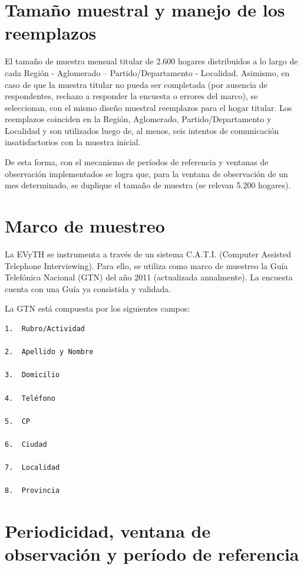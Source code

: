 \documentclass[
  openany]{book}
\begin{document}
\hypertarget{tamauxf1o-muestral-y-manejo-de-los-reemplazos}{%
\section{Tamaño muestral y manejo de los reemplazos}\label{tamauxf1o-muestral-y-manejo-de-los-reemplazos}}

El tamaño de muestra mensual titular de 2.600 hogares distribuidos a lo largo de cada Región - Aglomerado -- Partido/Departamento - Localidad. Asimismo, en caso de que la muestra titular no pueda ser completada (por ausencia de respondentes, rechazo a responder la encuesta o errores del marco), se seleccionan, con el mismo diseño muestral reemplazos para el hogar titular. Los reemplazos coinciden en la Región, Aglomerado, Partido/Departamento y Localidad y son utilizados luego de, al menos, seis intentos de comunicación insatisfactorios con la muestra inicial.

De esta forma, con el mecanismo de períodos de referencia y ventanas de observación implementados se logra que, para la ventana de observación de un mes determinado, se duplique el tamaño de muestra (se relevan 5.200 hogares).

\hypertarget{marco-de-muestreo}{%
\section{Marco de muestreo}\label{marco-de-muestreo}}

La EVyTH se instrumenta a través de un sistema C.A.T.I. (Computer Assisted Telephone Interviewing). Para ello, se utiliza como marco de muestreo la Guía Telefónica Nacional (GTN) del año 2011 (actualizada anualmente). La encuesta cuenta con una Guía ya consistida y validada.

La GTN está compuesta por los siguientes campos:

\begin{verbatim}
1.  Rubro/Actividad

2.  Apellido y Nombre

3.  Domicilio

4.  Teléfono

5.  CP

6.  Ciudad

7.  Localidad

8.  Provincia
\end{verbatim}

\hypertarget{periodicidad-ventana-de-observaciuxf3n-y-peruxedodo-de-referencia}{%
\section{Periodicidad, ventana de observación y período de referencia}\label{periodicidad-ventana-de-observaciuxf3n-y-peruxedodo-de-referencia}}
\end{document}

